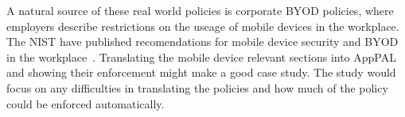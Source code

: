 \documentclass{scrartcl}
\begin{document}
A natural source of these real world policies is corporate \ac{BYOD} policies, where employers describe restrictions on the useage of mobile devices in the workplace.
The \ac{NIST} have published recomendations for mobile device security and \ac{BYOD} in the workplace~\citep{Souppaya:2013jf,Scarfone:2009vy}.
Translating the mobile device relevant sections into AppPAL and showing their enforcement might make a good case study.
The study would focus on any difficulties in translating the policies and how much of the policy could be enforced automatically.



\end{document}
